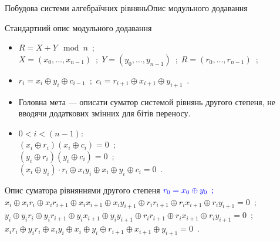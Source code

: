 \documentclass[10pt, ucs]{beamer}
\begin{document}
\begin{frame}{Побудова системи алгебраїчних рівнянь}{Опис модульного додавання}
    \begin{block}{Стандартний опис модульного додавання}
        \begin{itemize}
                \small
            \item $R = X + Y \mod n \enspace;$ \\
                $ X = (x_0, \hdots, x_{n-1}) \enspace; \; 
                Y = (y_0, \hdots, y_{n-1}) \enspace; \;
                R = (r_0, \hdots, r_{n-1}) \enspace; $
            \item 
                $r_i = x_i \oplus y_i \oplus c_{i-1} \enspace;$ \hspace{4ex} 
                $c_i = r_{i+1} \oplus x_{i+1} \oplus y_{i+1} \enspace.$
        \end{itemize}
    \end{block}
    \begin{block}{}
        \begin{itemize}
                \small
            \item Головна мета --- описати суматор системой рівнянь другого степеня,
                не вводячи додаткових змінних для бітів переносу.
            \item $0 < i < (n - 1)$: \\
                $(x_i \oplus r_i) (x_i \oplus c_i) = 0 \enspace;$ \\
                $(y_i \oplus r_i) (y_i \oplus c_i) = 0 \enspace;$ \\
                $(x_i \oplus y_i) \cdot r_i \oplus x_i y_i \oplus x_i \oplus y_i \oplus c_i = 0 \enspace.$
        \end{itemize}
    \end{block}
    \begin{block}{Опис суматора рівняннями другого степеня}
        \small
        $\color{blue} r_0 = x_0 \oplus y_0 \enspace;$ \\
        $x_i \oplus x_i r_i \oplus x_i r_{i+1} \oplus x_i x_{i+1} \oplus x_i y_{i+1} \oplus r_i r_{i+1} \oplus r_i x_{i+1} \oplus r_i y_{i+1} = 0 \enspace;$ \\
        $y_i \oplus y_i r_i \oplus y_i r_{i+1} \oplus y_i x_{i+1} \oplus y_i y_{i+1} \oplus r_i r_{i+1} \oplus r_i x_{i+1} \oplus r_i y_{i+1} = 0 \enspace;$ \\
        $x_i r_i \oplus y_i r_i \oplus x_i y_i \oplus x_i \oplus y_i \oplus r_{i+1} \oplus x_{i+1} \oplus y_{i+1} = 0 \enspace.$ 
    \end{block}
\end{frame}
\end{document}
